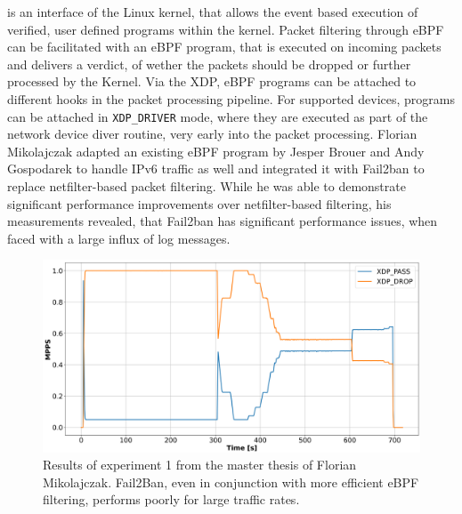 is an interface of the Linux kernel, that allows the event based execution of verified, user defined programs within the kernel. Packet filtering through \ac{eBPF} can be facilitated with an \ac{eBPF} program,
that is executed on incoming packets and delivers a verdict, of wether the packets should be dropped or further processed by the Kernel. Via the \ac{XDP}, \ac{eBPF} programs can be attached to different hooks in 
the packet processing pipeline. For supported devices, programs can be attached in \texttt{XDP\_DRIVER} mode, where they are executed as part of the network device diver routine, very early into the packet processing. Florian Mikolajczak adapted an existing \ac{eBPF} program by Jesper Brouer
and Andy Gospodarek to handle \ac{IPv6} traffic as well and integrated it with Fail2ban to replace netfilter-based packet filtering. While he was able to demonstrate significant performance improvements over netfilter-based filtering, his measurements 
revealed, that Fail2ban has significant performance issues, when faced with a large influx of log messages. 

\begin{figure}[h!]
	\label{fig:fail2ban:mikolajczak2022}
	\centering
	\scriptsize
    \centerline{\includegraphics[width=1.2\textwidth]{images/Fail2Ban2.png}}
    \caption[Fail2ban measurement by \cite{mikolajczak2022}]{Results of experiment 1 from the  master thesis of Florian Mikolajczak\cite{mikolajczak2022}. Fail2Ban, even in conjunction with more efficient \ac{eBPF} filtering, performs poorly for large traffic rates.}
\end{figure}

